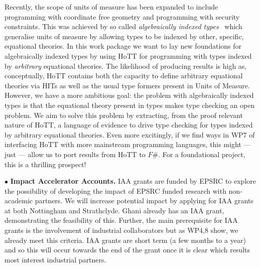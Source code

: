 \documentclass[a4paper,11pt]{article}
\begin{document}
Recently, the scope of units of measure has been expanded to include
programming with coordinate free geometry and programming with
security constraints. This was achieved by so called {\em
  algebraically indexed types}~\cite{ajk} which generalise units of
measure by allowing types to be indexed by other, specific, equational
theories. In this work package we want to lay new foundations for
algebraically indexed types by using HoTT for programming with types
indexed by {\em arbitrary} equational theories. The likelihood of
producing results is high as, conceptually, HoTT contains both the
capacity to define arbitrary equational theories via HITs as well as
the usual type formers present in Units of Measure. However, we have a
more ambitious goal: the problem with algebraically indexed types is
that the equational theory present in types makes type checking an
open problem. We aim to solve this problem by extracting, from the proof
relevant nature of HoTT, a language of evidence to drive type checking
for types indexed by arbitrary equational theories. Even more
excitingly, if we find ways in WP7 of interfacing HoTT with more
mainstream programming languages, this might --- just --- allow us to port
results from HoTT to $F\#$.  For a foundational project, this is a
thrilling prospect!


\vspace*{0.02in}

$\bullet$ {\bf Impact Accelerator Accounts.} IAA grants are funded by
EPSRC to explore the possibility of developing the impact of EPSRC
funded research with non-academic partners. We will increase potential
impact by applying for IAA grants at both Nottingham and
Strathclyde. Ghani already has an IAA grant, demonstrating the
feasibility of this. Further, the main prerequisite for IAA grants is
the involvement of industrial collaborators but as WP4,8 show, we
already meet this criteria. IAA grants are short term (a few months to
a year) and so this will occur towards the end of the grant once it is
clear which results most interest industrial partners.

\vspace*{0.02in}
\end{document}
